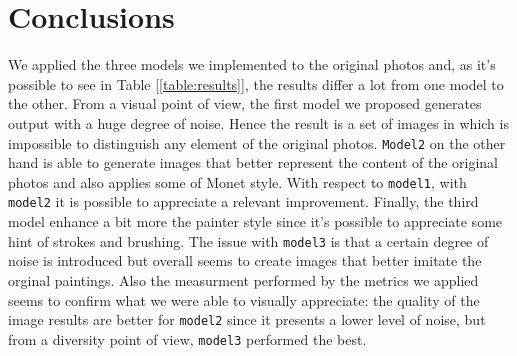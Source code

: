 \documentclass[10pt,twocolumn,letterpaper]{article}
\begin{document}
\section{Conclusions}
We applied the three models we implemented to the original photos and, as it's possible to see in Table [\ref{table:results}], the results differ a lot from one model to the other. From a visual point of view, the first model we proposed generates output with a huge degree of noise. Hence the result is a set of images in which is impossible to distinguish any element of the original photos. \texttt{Model2} on the other hand is able to generate images that better represent the content of the original photos and also applies some of Monet style. With respect to \texttt{model1}, with \texttt{model2} it is possible to appreciate a relevant improvement. Finally, the third model enhance a bit more the painter style since it's possible to appreciate some hint of strokes and brushing. The issue with \texttt{model3} is that a certain degree of noise is introduced but overall seems to create images that better imitate the orginal paintings. Also the measurment performed by the metrics we applied seems to confirm what we were able to visually appreciate: the quality of the image results are better for \texttt{model2} since it presents a lower level of noise, but from a diversity point of view, \texttt{model3} performed the best. 

{\small


}
\end{document}
